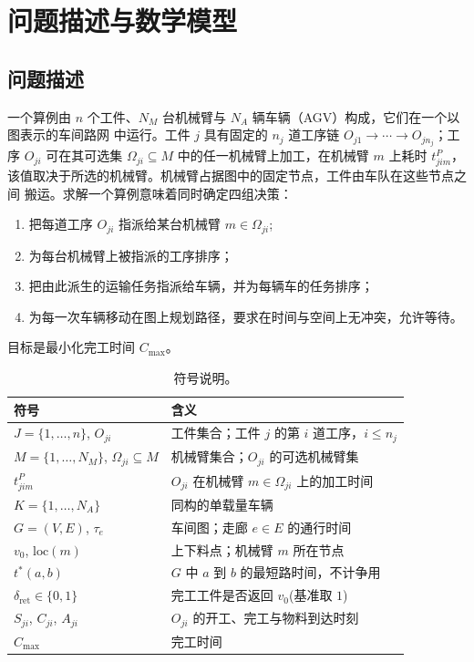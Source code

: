 \documentclass[manuscript,screen,review]{acmart}
\begin{document}
\section{问题描述与数学模型}
\label{sec:Chapter_III}
\subsection{问题描述}

一个算例由 $n$ 个工件、$N_M$ 台机械臂与 $N_A$ 辆车辆（AGV）构成，它们在一个以图表示的车间路网
中运行。工件 $j$ 具有固定的 $n_j$ 道工序链 $O_{j1}\to\cdots\to O_{jn_j}$；工序 $O_{ji}$
可在其可选集 $\Omega_{ji}\subseteq M$ 中的任一机械臂上加工，在机械臂 $m$ 上耗时
$t^P_{jim}$，该值取决于所选的机械臂。机械臂占据图中的固定节点，工件由车队在这些节点之间
搬运。求解一个算例意味着同时确定四组决策：

\begin{enumerate}[label=(\roman*),leftmargin=*,topsep=2pt,itemsep=1pt]
\item 把每道工序 $O_{ji}$ 指派给某台机械臂 $m\in\Omega_{ji}$;
\item 为每台机械臂上被指派的工序排序；
\item 把由此派生的运输任务指派给车辆，并为每辆车的任务排序；
\item 为每一次车辆移动在图上规划路径，要求在时间与空间上无冲突，允许等待。
\end{enumerate}

目标是最小化完工时间 $C_{\max}$。

\begin{table}[t]
\caption{符号说明。}
\label{tab:notation}
\small
\begin{tabular}{@{}ll@{}}
\toprule
符号 & 含义 \\
\midrule
$J=\{1,\dots,n\}$, $O_{ji}$ & 工件集合；工件 $j$ 的第 $i$ 道工序，$i\le n_j$ \\
$M=\{1,\dots,N_M\}$, $\Omega_{ji}\subseteq M$ & 机械臂集合；$O_{ji}$ 的可选机械臂集 \\
$t^P_{jim}$ & $O_{ji}$ 在机械臂 $m\in\Omega_{ji}$ 上的加工时间 \\
$K=\{1,\dots,N_A\}$ & 同构的单载量车辆 \\
$G=(V,E)$, $\tau_e$ & 车间图；走廊 $e\in E$ 的通行时间 \\
$v_0$, $\mathrm{loc}(m)$ & 上下料点；机械臂 $m$ 所在节点 \\
$t^{*}(a,b)$ & $G$ 中 $a$ 到 $b$ 的最短路时间，不计争用 \\
$\delta_{\mathrm{ret}}\in\{0,1\}$ & 完工工件是否返回 $v_0$(基准取 $1$) \\
$S_{ji}$, $C_{ji}$, $A_{ji}$ & $O_{ji}$ 的开工、完工与物料到达时刻 \\
$C_{\max}$ & 完工时间 \\
\bottomrule
\end{tabular}
\end{table}
\end{document}
